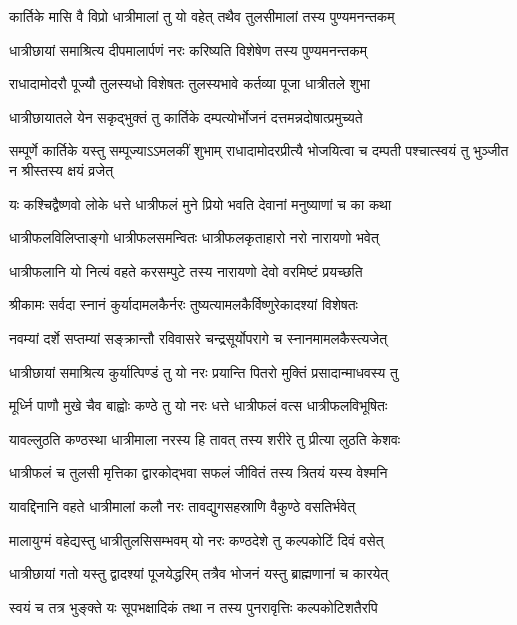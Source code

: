 \twolineshloka
{कार्तिके मासि वै विप्रो धात्रीमालां तु यो वहेत्}
{तथैव तुलसीमालां तस्य पुण्यमनन्तकम्} %

\twolineshloka
{धात्रीछायां समाश्रित्य दीपमालार्पणं नरः}
{करिष्यति विशेषेण तस्य पुण्यमनन्तकम्} %

\twolineshloka
{राधादामोदरौ पूज्यौ तुलस्यधो विशेषतः}
{तुलस्यभावे कर्तव्या पूजा धात्रीतले शुभा} %

\twolineshloka
{धात्रीछायातले येन सकृद्भुक्तं तु कार्तिके}
{दम्पत्योर्भोजनं दत्तमन्नदोषात्प्रमुच्यते} %

\threelineshloka
{सम्पूर्णे कार्तिके यस्तु सम्पूज्याऽऽमलकीं शुभाम्}
{राधादामोदरप्रीत्यै भोजयित्वा च दम्पती}
{पश्चात्स्वयं तु भुञ्जीत न श्रीस्तस्य क्षयं व्रजेत्} %

\twolineshloka
{यः कश्चिद्वैष्णवो लोके धत्ते धात्रीफलं मुने}
{प्रियो भवति देवानां मनुष्याणां च का कथा} %

\twolineshloka
{धात्रीफलविलिप्ताङ्गो धात्रीफलसमन्वितः}
{धात्रीफलकृताहारो नरो नारायणो भवेत्} %

\twolineshloka
{धात्रीफलानि यो नित्यं वहते करसम्पुटे}
{तस्य नारायणो देवो वरमिष्टं प्रयच्छति} %

\twolineshloka
{श्रीकामः सर्वदा स्नानं कुर्यादामलकैर्नरः}
{तुष्यत्यामलकैर्विष्णुरेकादश्यां विशेषतः} %

\twolineshloka
{नवम्यां दर्शे सप्तम्यां सङ्क्रान्तौ रविवासरे}
{चन्द्रसूर्योपरागे च स्नानमामलकैस्त्यजेत्} %

\twolineshloka
{धात्रीछायां समाश्रित्य कुर्यात्पिण्डं तु यो नरः}
{प्रयान्ति पितरो मुक्तिं प्रसादान्माधवस्य तु} %

\twolineshloka
{मूर्ध्नि पाणौ मुखे चैव बाह्वोः कण्ठे तु यो नरः}
{धत्ते धात्रीफलं वत्स धात्रीफलविभूषितः} %

\twolineshloka
{यावल्लुठति कण्ठस्था धात्रीमाला नरस्य हि}
{तावत् तस्य शरीरे तु प्रीत्या लुठति केशवः} %

\twolineshloka
{धात्रीफलं च तुलसी मृत्तिका द्वारकोद्भवा}
{सफलं जीवितं तस्य त्रितयं यस्य वेश्मनि} %


\twolineshloka
{यावद्दिनानि वहते धात्रीमालां कलौ नरः}
{तावद्युगसहस्राणि वैकुण्ठे वसतिर्भवेत्} %

\twolineshloka
{मालायुग्मं वहेद्यस्तु धात्रीतुलसिसम्भवम्}
{यो नरः कण्ठदेशे तु कल्पकोटिं दिवं वसेत्} %

\twolineshloka
{धात्रीछायां गतो यस्तु द्वादश्यां पूजयेद्धरिम्}
{तत्रैव भोजनं यस्तु ब्राह्मणानां च कारयेत्} %

\twolineshloka
{स्वयं च तत्र भुङ्क्ते यः सूपभक्षादिकं तथा}
{न तस्य पुनरावृत्तिः कल्पकोटिशतैरपि} %


